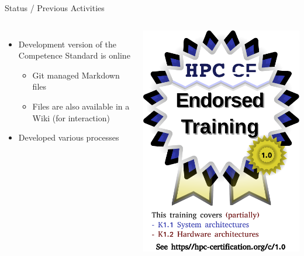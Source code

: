 \documentclass[compress,aspectratio=169]{beamer}
\begin{document}
\begin{frame}{Status / Previous Activities}
\begin{columns}
\vspace*{-1cm}
	\begin{itemize}  
	\item Development version of the Competence Standard is online
    \begin{itemize}
      \item Git managed Markdown files
      \item Files are also available in a Wiki (for interaction)
    \end{itemize}
  \item Developed various processes
\end{itemize}

\includegraphics[width=\textwidth]{certified.pdf}
\end{columns}


\end{frame}
\end{document}
